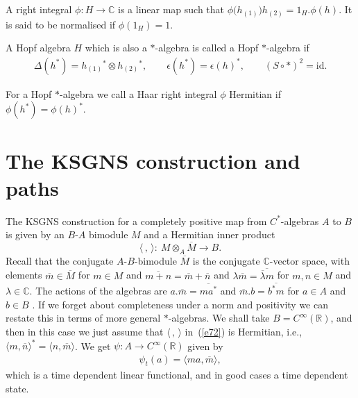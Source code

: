 \documentclass[10pt,a4paper]{amsart}
\numberwithin{equation}{section}
\newcommand{\id}{\mathrm{id}}
\newcommand{\tens}{\mathop{\otimes}}
\newcommand{\R}{\mathbb{R}}
\newcommand{\C}{\mathbb{C}}
\newcommand{\<}{\langle}
\renewcommand{\>}{\rangle}
\begin{document}
\begin{Definition}A right integral $ \phi\colon H\rightarrow \C $ is a linear map such that $ \phi \big(h_{(1)}\big) h_{(2)}=1_{H}. \phi (h)$. It is said to be normalised if $ \phi (1_{H}) =1$.
\end{Definition}
\begin{Definition} A Hopf algebra $ H $ which is also a $ * $-algebra is called a Hopf $ * $-algebra if
\begin{gather*}
	\Delta(h^{*})=h_{(1)}{}^{*}\tens h_{(2)}{}^{*},\qquad \epsilon(h^{*})=\epsilon(h)^{*}, \qquad (S\circ *)^{2}=\id.
\end{gather*}
\end{Definition}
For a Hopf $ * $-algebra we call a Haar right integral $ \phi $ Hermitian if $ \phi(h^{*}) =\phi(h)^{*}$.

\section{The KSGNS construction and paths}\label{Ch1}
The KSGNS construction \cite{Lance} for a completely positive map from $ C^{*} $-algebras $ A $ to $ B $ is given by an $ B $-$ A $ bimodule $ M $ and a Hermitian inner product
\begin{equation}\label{e72}
\langle\, ,\,\rangle\colon \ M \tens_{A} \overline{M} \longrightarrow B.
\end{equation}
Recall that the conjugate $ A$-$B $-bimodule $ \overline{M}$ is the conjugate $ \C $-vector space, with elements $ \overline{m}\in \overline{M} $ for $ m\in M $ and $ \overline{m+n}=\overline{m}+\overline{n} $ and $ \lambda \overline{m}=\overline{\overline{\lambda}m} $ for $ m,n \in M $ and $ \lambda \in \C $. The actions of the algebras are $ a. \overline{m}= \overline{m a^{*}} $ and $ \overline{m}. b= \overline{b^{*}m} $ for $ a \in A $ and $ b \in B $ \cite{BMBarcategories}. If we forget about completeness under a norm and positivity we can restate this in terms of more general $ * $-algebras. We shall take $ B= C^\infty(\R)$, and then in this case we just assume that $ \<\,,\,\> $ in~(\ref{e72}) is Hermitian, i.e., $ \<m,\overline{n}\>^{*} =\<n, \overline{m}\>$. We get $ \psi\colon A\rightarrow C^\infty(\R) $ given by
\begin{align}\label{e50}
\psi_t (a)=\langle m a, \overline{m}\rangle,
\end{align}
which is a time dependent linear functional, and in good cases a time dependent state.
\end{document}
